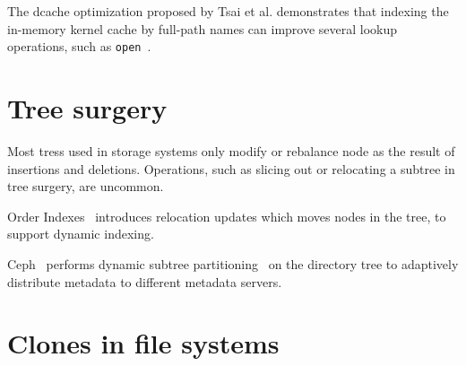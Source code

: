 The dcache optimization proposed by Tsai et al. demonstrates that
indexing the in-memory kernel cache by full-path names can improve several
lookup operations, such as \texttt{open}~\citep{dcache}.

\section{Tree surgery}

Most tress used in storage systems only modify or rebalance node as the result
of insertions and deletions.
Operations, such as slicing out or relocating a subtree in tree surgery,
are uncommon.

Order Indexes~\citep{orderindex} introduces relocation updates which moves nodes
in the tree, to support dynamic indexing.

Ceph~\citep{ceph} performs dynamic subtree partitioning~\citep{cephtree} on the
directory tree to adaptively distribute metadata to different metadata servers.

\section{Clones in file systems}


